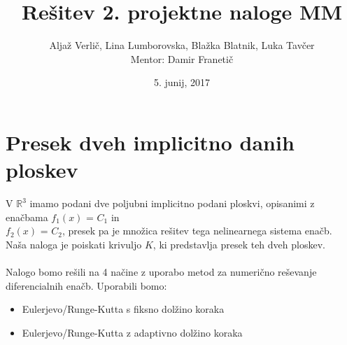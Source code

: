 \documentclass[]{article}
\title{Rešitev 2. projektne naloge MM}
\author{Aljaž Verlič, Lina Lumborovska, Blažka Blatnik, Luka Tavčer \\
	Mentor: Damir Franetič}
\date{5. junij, 2017}
\begin{document}
\maketitle
\renewcommand{\abstractname}{Uvod}


\section{Presek dveh implicitno danih ploskev}
	V $\mathbb{R}^3$ imamo podani dve poljubni implicitno podani ploskvi, opisanimi z enačbama $f_{1}(x)$ = $C_{1}$ in\\ $f_{2}(x)$ = $C_{2}$, presek pa je množica rešitev tega nelinearnega sistema enačb.\\
	Naša naloga je poiskati krivuljo $K$, ki predstavlja presek teh dveh ploskev. \\ \\
	Nalogo bomo rešili na 4 načine z uporabo metod za numerično reševanje diferencialnih enačb. Uporabili bomo:
	\begin{itemize}  
		\item Eulerjevo/Runge-Kutta s fiksno dolžino koraka
		\item Eulerjevo/Runge-Kutta z adaptivno dolžino koraka
	\end{itemize}
\end{document}
